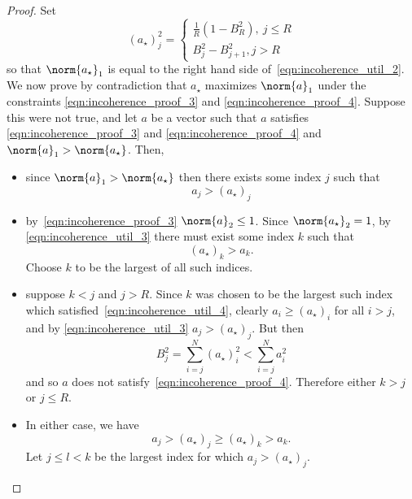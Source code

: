 \documentclass{article}
\newcommand{\1}{\mathbf{1}}
\theoremstyle{alden}
\theoremstyle{aldenthm}
\theoremstyle{definition}
\theoremstyle{remark}
\begin{document}
\begin{proof}
	Set
	\begin{equation*}
	(a_\star)_j^2 = 
	\begin{cases*}
	\frac{1}{R}(1 - B_R^2), ~ j \leq R \\
	B_j^2 - B_{j + 1}^2, j > R
	\end{cases*}
	\end{equation*}
	so that $\norm{a_\star}_1$ is equal to the right hand side of~\eqref{eqn:incoherence_util_2}. We now prove by contradiction that $a_\star$ maximizes $\norm{a}_1$ under the constraints \eqref{eqn:incoherence_proof_3} and \eqref{eqn:incoherence_proof_4}. Suppose this were not true, and let $a$ be a vector such that $a$ satisfies \eqref{eqn:incoherence_proof_3} and \eqref{eqn:incoherence_proof_4} and $\norm{a}_1 > \norm{a_{\star}}$. Then,
	\begin{itemize}
		\item since $\norm{a}_1 > \norm{a_{\star}}$ then there exists some index $j$ such that
		\begin{equation}
		\label{eqn:incoherence_util_3}
		a_j > (a_{\star})_j
		\end{equation} 
		\item by~\eqref{eqn:incoherence_proof_3} $\norm{a}_2 \leq 1$. Since $\norm{a_{\star}}_2 = 1$, by \eqref{eqn:incoherence_util_3} there must exist some index $k$ such that
		\begin{equation}
		\label{eqn:incoherence_util_4}
		(a_{\star})_k > a_k.
		\end{equation} 
		Choose $k$ to be the largest of all such indices.
		\item suppose $k < j$ and $j > R$. Since $k$ was chosen to be the largest such index which satisfied~\eqref{eqn:incoherence_util_4}, clearly $a_i \geq (a_{\star})_i$ for all $i > j$, and by \eqref{eqn:incoherence_util_3} $a_j > (a_{\star})_j$. But then 
		\begin{equation*}
		B_j^2 = \sum_{i = j}^{N} (a_{\star})_i^2 < \sum_{i = j}^{N} a_i^2 
		\end{equation*}
		and so $a$ does not satisfy~\eqref{eqn:incoherence_proof_4}. Therefore either $k > j$ or $j \leq R$.
		\item In either case, we have
		\begin{equation*}
		a_j > (a_{\star})_j \geq (a_{\star})_k > a_k.
		\end{equation*}
		Let $j \leq l < k$ be the largest index for which $a_j > (a_{\star})_j$. 
		

\end{itemize}
\end{proof}
\end{document}
